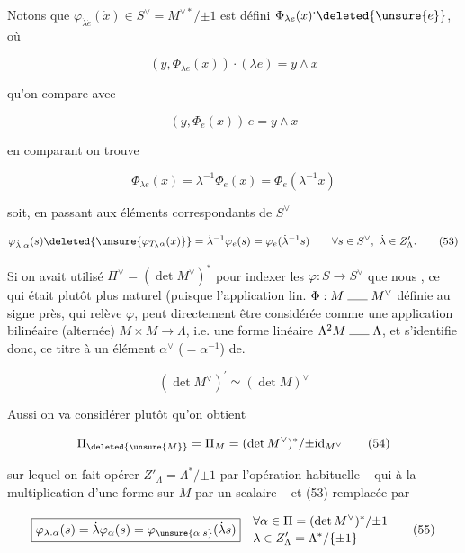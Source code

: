 
 

Notons que $\varphi_{\dot\lambda\dot e}(\dot x)\in S^\vee=M^{\vee *}/{\pm1}$ est défini   $\Phi_{\lambda e}(x)^{\boldsymbol\cdot}\deleted{\unsure{e}}$, où  

\[
(y,\Phi_{\lambda e}(x))\cdot(\lambda e)=y\wedge x
\]

qu'on compare avec

\[
(y,\Phi_e(x))\,e=y\wedge x
\]

en comparant on trouve

\[
\Phi_{\lambda e}(x)=\lambda^{-1}\Phi_e(x)=\Phi_e(\lambda^{-1}x)
\]

soit, en passant aux éléments correspondants de $S^\vee$

\[
\varphi_{\dot\lambda.\alpha}(s)\deleted{\unsure{\varphi_{T_\lambda\alpha}(x)}}=
\dot\lambda^{-1}\varphi_e(s)=\varphi_e(\dot\lambda^{-1}s)
\qquad\forall s\in S^\vee,\ \dot\lambda\in Z'_\Lambda. \tag*{(53)}
\]


Si on avait utilisé $\Pi^\vee=(\det M^\vee)^*$ pour indexer les $\varphi:S\longrightarrow S^\vee$ que nous , ce qui était plutôt plus naturel (puisque l'application lin.  $\Phi:M\mathrel{\rule{1.6em}{0.35pt}}M^\vee$ définie au signe près, qui relève $\varphi$, peut  directement être considérée comme une application bilinéaire (alternée) $M\times M\longrightarrow\Lambda$, i.e. une forme linéaire $\Lambda^2M\mathrel{\rule{1.6em}{0.35pt}}\Lambda$, et s'identifie donc, ce titre à un élément $\alpha^\vee$ ($=\alpha^{-1}$) de.

\[
(\det M^\vee)^{\prime}\simeq(\det M)^\vee
\]

Aussi on va considérer plutôt qu'on obtient

\[
\Pi_{\deleted{\unsure{M}}}=\Pi_M=(\det M^\vee)^*/{\pm\mathrm{id}_{M^\vee}} \tag*{(54)}
\]

sur lequel on fait opérer \deleted{$\unsure{\Lambda}$} $Z'_\Lambda=\Lambda^*/{\pm1}$ par l'opération habituelle -- qui   à la multiplication d'une forme sur $M$ par un scalaire -- et (53)  remplacée par

\[
\boxed{\varphi_{\lambda.\alpha}(s)=\dot\lambda\varphi_\alpha(s)=\varphi_{\unsure{\alpha|s}}(\dot\lambda s)}
\quad\begin{aligned}
&\forall\alpha\in\Pi=(\det M^\vee)^*/{\pm1}\\[-1pt]
&\lambda\in Z'_\Lambda=\Lambda^*/\{\pm1\}
\end{aligned} \tag*{(55)}
\]

